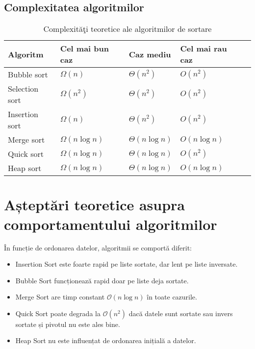 \documentclass{article}
\begin{document}
\subsection{Complexitatea algoritmilor}
\begin{table}[H]
\centering
\begin{tabular}{|l|l|l|l|l|}
\hline
\textbf{Algoritm}&\textbf{Cel mai bun caz}&\textbf{Caz mediu}&\textbf{Cel mai rau caz}\\
\hline
Bubble sort    & $\Omega(n)$         & $\Theta(n^{2})$        & $O(n^{2})$        \\
Selection sort & $\Omega(n^{2})$     & $\Theta(n^{2})$        & $O(n^{2})$     \\
Insertion sort & $\Omega(n)$         & $\Theta(n^{2})$        & $O(n^{2})$        \\
Merge sort     & $\Omega(n\log n)$   & $\Theta(n\log n)$      & $O(n\log n)$     \\
Quick sort     & $\Omega(n\log n)$   & $\Theta(n\log n)$      & $O(n^{2})$    \\
Heap sort      & $\Omega(n\log n)$   & $\Theta(n\log n)$      & $O(n\log n)$   \\
\hline
\end{tabular}
\caption{Complexităţi teoretice ale algoritmilor de sortare \cite{bigocheatsheet} } 
\label{tab:complexitate}
\end{table}

\section{Așteptări teoretice asupra comportamentului algoritmilor}
În funcție de ordonarea datelor, algoritmii se comportă diferit:

\begin{itemize}
    \item Insertion Sort este foarte rapid pe liste sortate, dar lent pe liste inversate.
    \item Bubble Sort funcționează rapid doar pe liste deja sortate.
    \item Merge Sort are timp constant $\mathcal{O}(n\log n)$ în toate cazurile.
    \item Quick Sort poate degrada la $\mathcal{O}(n^2)$ dacă datele sunt sortate sau invers sortate și pivotul nu este ales bine.
    \item Heap Sort nu este influențat de ordonarea inițială a datelor.
\end{itemize}
\end{document}

